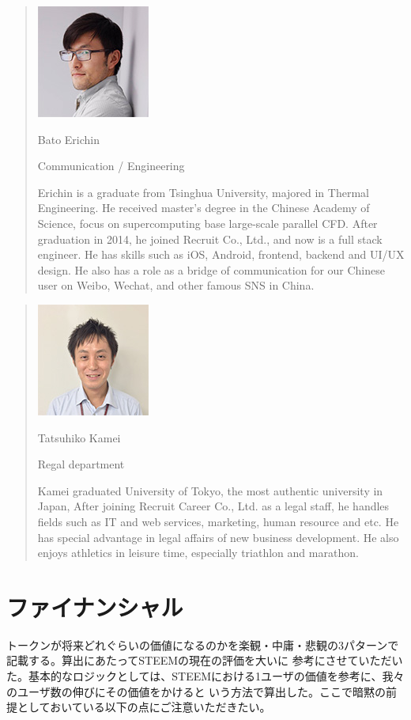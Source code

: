 \documentclass{jsarticle}
\begin{document}
\begin{quote}

	\includegraphics[scale=0.3]{img/erichin.jpg}

Bato Erichin

Communication / Engineering

Erichin is a graduate from Tsinghua University, majored in Thermal Engineering. 
He received master's degree in the Chinese Academy of Science, focus on 
supercomputing base large-scale parallel CFD. After graduation in 2014, he 
joined Recruit Co., Ltd., and now is a full stack engineer. He has skills such as 
iOS, Android, frontend, backend and UI/UX design. He also has a role as a bridge 
of communication for our Chinese user on Weibo, Wechat, and other famous SNS in China.
\end{quote}
\begin{quote}

	\includegraphics[scale=0.3]{img/kamei.jpg}

Tatsuhiko Kamei

Regal department

Kamei graduated University of Tokyo, the most authentic university in Japan, 
After joining Recruit Career Co., Ltd. as a legal staff, he handles fields such as 
IT and web services, marketing, human resource and etc. He has special advantage 
in legal affairs of new business development. He also enjoys athletics in leisure time, 
especially triathlon and marathon.
\end{quote}
\section{ファイナンシャル}
トークンが将来どれぐらいの価値になるのかを楽観・中庸・悲観の3パターンで記載する。算出にあたってSTEEMの現在の評価を大いに
参考にさせていただいた。基本的なロジックとしては、STEEMにおける1ユーザの価値を参考に、我々のユーザ数の伸びにその価値をかけると
いう方法で算出した。ここで暗黙の前提としておいている以下の点にご注意いただきたい。
\end{document}

